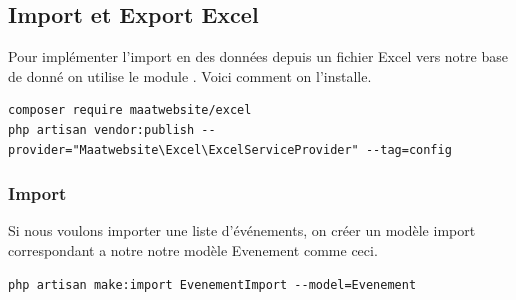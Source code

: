 \documentclass[12pt,a4paper]{article}
\begin{document}
\subsection{Import et Export Excel}
Pour implémenter l'import en des données depuis un fichier Excel vers notre base de donné on utilise le
module . Voici comment on l'installe.

\begin{verbatim}
composer require maatwebsite/excel
php artisan vendor:publish --provider="Maatwebsite\Excel\ExcelServiceProvider" --tag=config
\end{verbatim}

\subsubsection{Import}
Si nous voulons importer une liste d'événements, on créer un modèle import correspondant a notre
notre modèle Evenement comme ceci.

\begin{verbatim}
php artisan make:import EvenementImport --model=Evenement
\end{verbatim}
\end{document}
